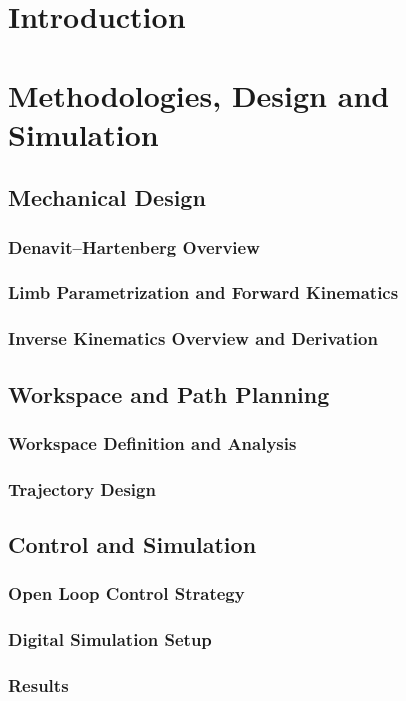 \chapter{Introduction}

\chapter{Methodologies, Design and Simulation}
    \section{Mechanical Design}
        \subsection{Denavit--Hartenberg Overview}
        \subsection{Limb Parametrization and Forward Kinematics}
        \subsection{Inverse Kinematics Overview and Derivation}
    \section{Workspace and Path Planning}
        \subsection{Workspace Definition and Analysis}
        \subsection{Trajectory Design}
    \section{Control and Simulation}
        \subsection{Open Loop Control Strategy}
        \subsection{Digital Simulation Setup}
        \subsection{Results}
